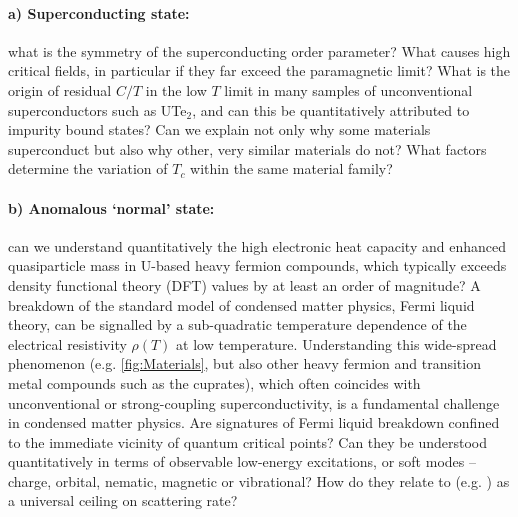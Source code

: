 \paragraph {a) Superconducting state:} what is the symmetry of the superconducting order parameter? What causes high critical fields, in particular if they far exceed the paramagnetic limit? %
What is the origin of residual $C/T$ in the low $T$ limit in many samples of unconventional superconductors such as UTe$_2$, and can this be quantitatively attributed to impurity bound states? 
Can we explain not only why some materials superconduct but also why other, very similar materials do not? What factors determine the variation of $T_c$ within the same material family? 


\paragraph{b) Anomalous `normal' state:} %
can we understand quantitatively the high electronic heat capacity and enhanced quasiparticle mass in U-based heavy fermion compounds, which typically exceeds density functional theory (DFT) values by at least an order of magnitude? A breakdown of the standard model of condensed matter physics, Fermi liquid theory, can be signalled by a sub-quadratic temperature dependence of the electrical resistivity $\rho(T)$ at low temperature. 
Understanding this wide-spread phenomenon  (e.g. \autoref{fig:Materials}, but also other heavy fermion and transition metal compounds such as the cuprates), which often coincides with unconventional or strong-coupling superconductivity, is a fundamental challenge in condensed matter physics. 
Are signatures of Fermi liquid breakdown confined to the immediate vicinity of quantum critical points?
Can they be understood quantitatively in terms of observable low-energy excitations, or soft modes -- charge, orbital, nematic, magnetic or vibrational? How do they relate to  (e.g. \cite{bruin13,hartnoll15}) as a universal ceiling on scattering rate? 

